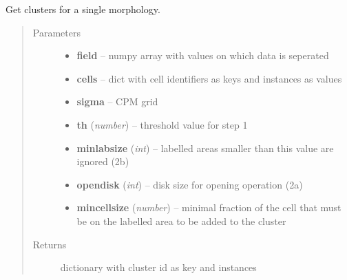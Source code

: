 \documentclass[letterpaper,10pt,english]{sphinxmanual}
\begin{document}
\begin{fulllineitems}
\label{AnalysisUtils:AnalysisUtils.getCellClusters}
Get clusters for a single morphology.
\begin{quote}\begin{description}
\item[{Parameters}] \leavevmode\begin{itemize}
\item {} 
\textbf{field} -- numpy array with values on which data is seperated

\item {} 
\textbf{cells} -- dict with cell identifiers as keys and  instances as values

\item {} 
\textbf{sigma} -- CPM grid

\item {} 
\textbf{th} (\emph{number}) -- threshold value for step 1

\item {} 
\textbf{minlabsize} (\emph{int}) -- labelled areas smaller than this value are ignored (2b)

\item {} 
\textbf{opendisk} (\emph{int}) -- disk size for opening operation (2a)

\item {} 
\textbf{mincellsize} (\emph{number}) -- minimal fraction of the cell that must be on the labelled area to be added to the cluster

\end{itemize}

\item[{Returns}] \leavevmode
dictionary with cluster id as key and {\hyperref[AnalysisUtils:AnalysisUtils.Cluster]{}} instances

\end{description}\end{quote}




{\hyperref[AnalysisUtils:AnalysisUtils.Cluster]{}}



\end{fulllineitems}

\end{document}
